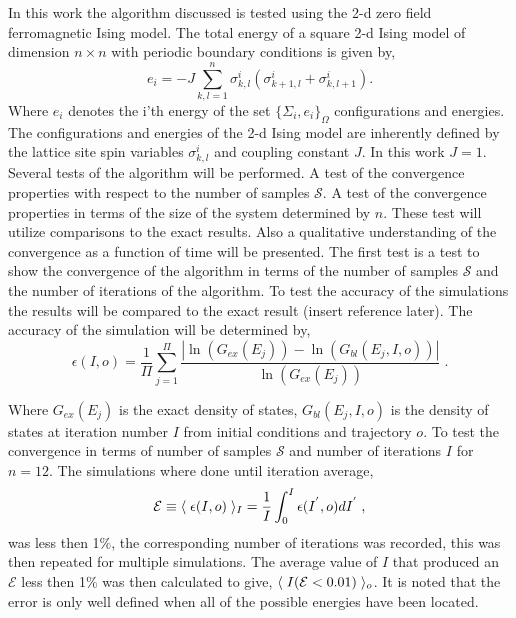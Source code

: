 \documentclass[twocolumn]{article}
\begin{document}
In this work the algorithm discussed is tested using the 2-d zero field ferromagnetic Ising model. The total energy of a square 2-d Ising model of dimension  $n\times n$ with periodic boundary conditions is given by, 
\begin{equation}
e_i = -J\sum_{k,l =1}^n \sigma^i_{k,l} 
\left( \sigma^i_{k+1,l} + \sigma^i_{k,l+1}
\right). \label{2D}
\end{equation}
Where $e_i$ denotes the i'th energy of the set  $\{\Sigma_i, e_i \}_{\Omega} $ configurations and energies. The configurations and energies of the 2-d Ising model are inherently defined by the lattice site spin variables $\sigma^i_{k,l}$ and coupling constant $J$. In this work $J=1$. Several tests of the algorithm will be performed. A test of the convergence properties with respect to the number of samples $\mathcal{S}$. A test of the convergence properties in terms of the size of the system determined by $n$. These test will utilize comparisons to the exact results. Also a qualitative understanding of the convergence as a function of time will be presented. 
The first test is a test to show the convergence of the algorithm in terms of the number of samples $\mathcal{S}$ and the number of iterations of the algorithm. To test the accuracy of the simulations the results will be compared to the exact result (insert reference later). The accuracy of the simulation will be determined by, 
\begin{equation}
\epsilon(I,o)  = \frac{1}{\Pi} \sum_{j=1}^{\Pi}\frac{|\ln(G_{ex}(E_j))- \ln(G_{bl}(E_j,I,o))|}{\ln(G_{ex}(E_j))}\; . 
\end{equation}

Where $G_{ex}(E_j)$ is the exact density of states, $G_{bl}(E_j,I,o)$ is the density of states at iteration number $I$ from initial conditions and trajectory $o$.
To test the convergence in terms of number of samples $\mathcal{S}$ and number of iterations $I$ for $n=12$.  The simulations where done until iteration average,
\begin{equation}
\mathcal{E} \equiv \langle \hspace{0.1cm} \epsilon(I,o)\hspace{0.1cm}\rangle_{I} = \frac{1}{I}\int_{0}^{I}\epsilon(I^{'},o)dI^{'} \;,
\end{equation}
 was less then 1$\%$, the corresponding number of iterations was recorded, this was then repeated for multiple simulations. The average value of $I$ that produced an $\mathcal{E}$ less then 1$\%$ was then calculated to give, $\langle \hspace{0.1cm}  I(\mathcal{E} < 0.01) \hspace{0.1cm}\rangle_{o}$. It is noted that the error is only well defined when all of the possible energies have been located. 
\end{document}

